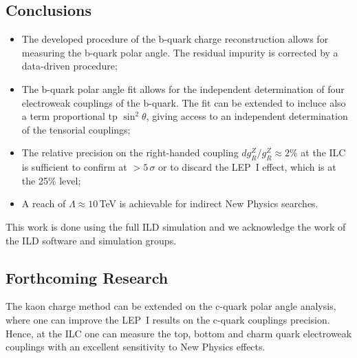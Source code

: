 
\color{Blue} %

\subsection*{Conclusions}

\begin{itemize}
\item The developed procedure of the b-quark charge reconstruction allows for measuring the b-quark polar angle. The residual impurity is corrected by a data-driven procedure;
\item The b-quark polar angle fit allows for the independent determination of four electroweak couplings of the b-quark. The fit can be extended to incluce also a term proportional tp $\sin^2\theta$, giving access to an independent determination of the tensorial couplings;
\item  The relative precision on the right-handed coupling $dg^Z_R/g^Z_R\approx 2$\% at the ILC is sufficient to confirm at $>5\,\sigma$ or to discard the LEP~I effect, which is at the 25\% level;
\item A reach of $\Lambda \approx 10$\,TeV is achievable for indirect New Physics searches.
\end{itemize}
\color{Red}
This work is done using the full ILD simulation and we acknowledge the work of the ILD software and simulation groups.
\color{DarkGreen} %


\subsection*{Forthcoming Research}
The kaon charge method can be extended on the c-quark polar angle analysis, where one can improve the LEP~I results on the c-quark couplings precision. 
Hence, at the ILC one can measure the top, bottom and charm quark electroweak couplings with an excellent sensitivity to New Physics effects.

